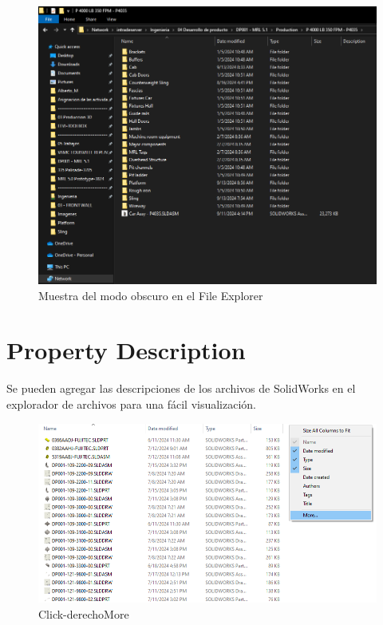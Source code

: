 \documentclass{report}
\begin{document}
\begin{figure}[H]
	\centering
	\includegraphics[width=0.85\linewidth, height=0.5\textheight,keepaspectratio]{Imagenes/fe_dark_mode03}
	\caption{Muestra del modo obscuro en el File Explorer}
	\label{fig:fedarkmode03}
\end{figure}


\chapter{Property Description}
	
Se pueden agregar las descripciones de los archivos de SolidWorks en el explorador de archivos para una fácil visualización.

\begin{figure}[H]
	\centering
	\includegraphics[width=0.95\linewidth, height=0.5\textheight,keepaspectratio]{Imagenes/fe_prop_desc}
	\caption{Click-derecho\textrightarrow More}
	\label{fig:fepropdesc}
\end{figure}
\end{document}
